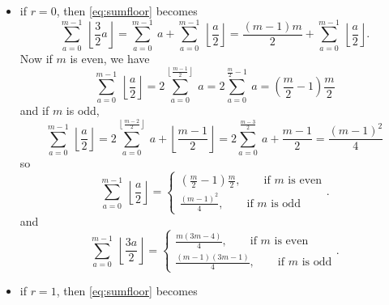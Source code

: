         \begin{itemize}
            \item if $r=0$, then \eqref{eq:sumfloor} becomes
            \begin{equation}
                \sum^{m-1}_{a=0}~\left\lfloor \frac{3}{2}a\right\rfloor = \sum^{m-1}_{a=0}~a+\sum^{m-1}_{a=0}~\left\lfloor \frac{a}{2}\right\rfloor = \frac{(m-1)m}{2}+\sum^{m-1}_{a=0}~\left\lfloor \frac{a}{2}\right\rfloor.
            \end{equation}
            Now if $m$ is even, we have
            \begin{equation}
                \sum^{m-1}_{a=0}~\left\lfloor \frac{a}{2}\right\rfloor = 2\sum^{\left\lfloor \frac{m-1}{2}\right\rfloor}_{a=0}~a = 2\sum^{\frac{m}{2}-1}_{a=0}~a = \left(\frac{m}{2}-1\right)\frac{m}{2}
            \end{equation}
            and if $m$ is odd,
            \begin{equation}
                \sum^{m-1}_{a=0}~\left\lfloor \frac{a}{2}\right\rfloor = 2\sum^{\left\lfloor \frac{m-2}{2}\right\rfloor}_{a=0}~a+\left\lfloor \frac{m-1}{2}\right\rfloor = 2\sum^{ \frac{m-3}{2}}_{a=0}~a+\frac{m-1}{2} = \frac{(m-1)^2}{4}
            \end{equation}
            so
            \begin{equation}
                \sum^{m-1}_{a=0}~\left\lfloor \frac{a}{2}\right\rfloor = 
                \begin{cases}
                    \left(\frac{m}{2}-1\right)\frac{m}{2},\qquad\text{if $m$ is even}\\
                    \frac{(m-1)^2}{4},\qquad\text{if $m$ is odd}
                \end{cases}.\label{eq:suma2floor}
            \end{equation}
            and
            \begin{equation}
                \sum^{m-1}_{a=0}~\left\lfloor \frac{3a}{2}\right\rfloor = 
                \begin{cases}
                    \frac{m(3m-4)}{4},\qquad\text{if $m$ is even}\\
                    \frac{(m-1)(3m-1)}{4},\qquad\text{if $m$ is odd}
                \end{cases}.\label{eq:sum3a2floor}
            \end{equation}
            \item if $r=1$, then \eqref{eq:sumfloor} becomes
            \begin{equation}

\end{equation}
\end{itemize}
